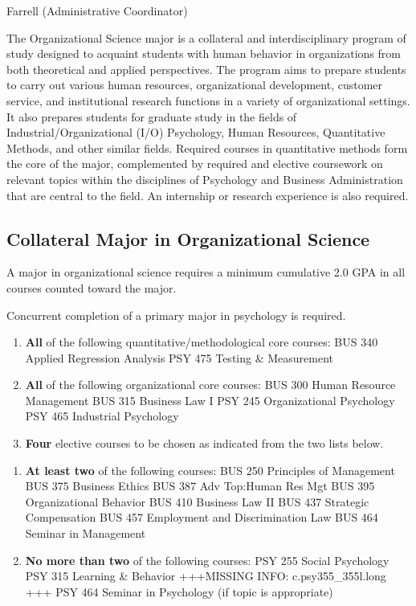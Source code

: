 \documentclass[
  letterpaper,
]{scrbook}
\begin{document}
Farrell (Administrative Coordinator)

The Organizational Science major is a collateral and interdisciplinary
program of study designed to acquaint students with human behavior in
organizations from both theoretical and applied perspectives. The
program aims to prepare students to carry out various human resources,
organizational development, customer service, and institutional research
functions in a variety of organizational settings. It also prepares
students for graduate study in the fields of Industrial/Organizational
(I/O) Psychology, Human Resources, Quantitative Methods, and other
similar fields. Required courses in quantitative methods form the core
of the major, complemented by required and elective coursework on
relevant topics within the disciplines of Psychology and Business
Administration that are central to the field. An internship or research
experience is also required.

\hypertarget{collateral-major-in-organizational-science}{%
\subsection{Collateral Major in Organizational
Science}\label{collateral-major-in-organizational-science}}

A major in organizational science requires a minimum cumulative 2.0 GPA
in all courses counted toward the major.

Concurrent completion of a primary major in psychology is required.

\begin{enumerate}
\def\labelenumi{\arabic{enumi}.}
\item
  \textbf{All} of the following quantitative/methodological core
  courses: BUS 340 Applied Regression Analysis PSY 475 Testing \&
  Measurement\\
\item
  \textbf{All} of the following organizational core courses: BUS 300
  Human Resource Management BUS 315 Business Law I PSY 245
  Organizational Psychology PSY 465 Industrial Psychology
\item
  \textbf{Four} elective courses to be chosen as indicated from the two
  lists below.
\end{enumerate}

\begin{enumerate}
\def\labelenumi{\alph{enumi}.}
\item
  \textbf{At least two} of the following courses: BUS 250 Principles of
  Management BUS 375 Business Ethics BUS 387 Adv Top:Human Res Mgt BUS
  395 Organizational Behavior BUS 410 Business Law II BUS 437 Strategic
  Compensation BUS 457 Employment and Discrimination Law BUS 464 Seminar
  in Management
\item
  \textbf{No more than two} of the following courses: PSY 255 Social
  Psychology PSY 315 Learning \& Behavior +++MISSING INFO:
  c.psy355\_355l.long +++ PSY 464 Seminar in Psychology (if topic is
  appropriate)
\end{enumerate}
\end{document}

